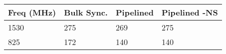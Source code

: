 \begin{tabular}{llll}
\textbf{Freq (MHz)}       & \textbf{Bulk Sync.} & \textbf{Pipelined} & \textbf{Pipelined -NS} \\ \hline
\multicolumn{1}{l|}{1530} & 275                 & 269                & 275                    \\
\multicolumn{1}{l|}{825}  & 172                 & 140                & 140                    \\ \hline
\end{tabular}
